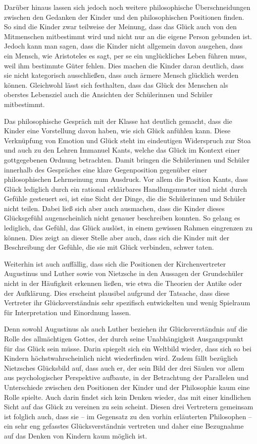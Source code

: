 Darüber hinaus lassen sich jedoch noch weitere philosophische Überschneidungen zwischen den Gedanken der Kinder und den philosophischen Positionen finden. 
So sind die Kinder zwar teilweise der Meinung, dass das Glück auch von den Mitmenschen mitbestimmt wird und nicht nur an die eigene Person gebunden ist. 
Jedoch kann man sagen, dass die Kinder nicht allgemein davon ausgehen, dass ein Mensch, wie Aristoteles es sagt, per se ein unglückliches Leben führen muss, weil ihm bestimmte Güter fehlen. 
Dies machen die Kinder daran deutlich, dass sie nicht kategorisch ausschließen, dass auch ärmere Mensch glücklich werden können.
Gleichwohl lässt sich festhalten, dass das Glück des Menschen als oberstes Lebensziel auch die Ansichten der Schülerinnen und Schüler mitbestimmt. 

Das philosophische Gespräch mit der Klasse hat deutlich gemacht, dass die Kinder eine Vorstellung davon haben, wie sich Glück anfühlen kann. 
Diese Verknüpfung von Emotion und Glück steht im eindeutigen Widerspruch zur Stoa und auch zu den Lehren Immanuel Kants, welche das Glück im Kontext einer gottgegebenen Ordnung betrachten.
Damit bringen die Schülerinnen und Schüler innerhalb des Gespräches  eine klare Gegenposition gegenüber einer philosophischen Lehrmeinung  zum Ausdruck. 
Vor allem die Position Kants, dass Glück lediglich durch ein rational erklärbares Handlungsmuster und nicht durch Gefühle gesteuert sei, ist eine Sicht der Dinge, die die Schülerinnen und Schüler nicht teilen. 
Dabei ließ sich aber auch ausmachen, dass die Kinder dieses Glücksgefühl augenscheinlich nicht genauer beschreiben konnten.
So gelang es lediglich, das Gefühl, das Glück auslöst, in einem gewissen Rahmen eingrenzen zu können.
Dies zeigt an dieser Stelle aber auch, dass sich die Kinder mit der Beschreibung der Gefühle, die sie mit Glück verbinden, schwer taten.

Weiterhin ist auch auffällig, dass sich die Positionen der Kirchenvertreter Augustinus und Luther sowie von Nietzsche in den Aussagen der Grundschüler nicht in der Häufigkeit erkennen ließen, wie etwa die Theorien der Antike oder der Aufklärung. 
Dies erscheint plausibel aufgrund der Tatsache, dass diese Vertreter ihr Glücksverständnis sehr spezifisch entwickelten und wenig Spielraum für Interpretation und Einordnung lassen. 

Denn sowohl Augustinus als auch Luther beziehen ihr Glücksverständnis auf die Rolle des allmächtigen Gottes, der durch seine Unabhängigkeit Ausgangspunkt für das Glück sein müsse. 
Darin spiegelt sich ein Weltbild wieder, dass sich so bei Kindern höchstwahrscheinlich nicht wiederfinden wird. 
Zudem fällt bezüglich Nietzsches Glücksbild auf, dass auch er, der sein Bild der drei Säulen vor allem aus psychologischer Perspektive  aufbaute, in der Betrachtung der Parallelen und Unterschiede zwischen den Positionen der Kinder und der Philosophie kaum eine Rolle spielte. 
Auch darin findet sich kein Denken wieder, das mit einer kindlichen Sicht auf das Glück zu vereinen zu sein scheint. 
Diesen drei Vertretern gemeinsam ist folglich auch, dass sie -- im Gegensatz zu den vorhin erläuterten Philosophen -- ein sehr eng gefasstes Glücksverständnis vertreten und daher eine Bezugnahme auf das Denken von Kindern kaum möglich ist. 

